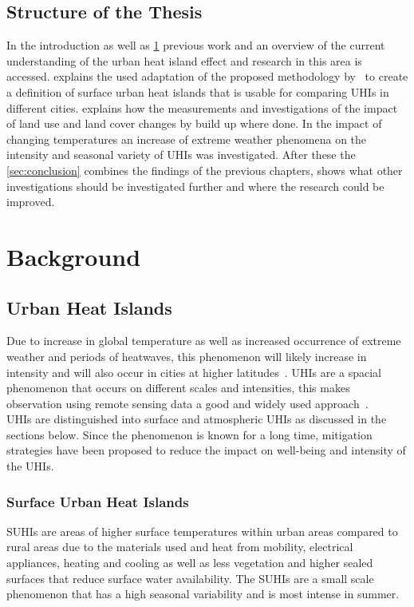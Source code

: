 \documentclass[12pt,a4paper, english]{article}
\begin{document}
  \subsection{Structure of the Thesis}
    In the introduction as well as \cref{sec:background} previous work and an overview of the current understanding of the urban heat island effect and research in this area is accessed. 
     explains the used adaptation of the proposed methodology by~\cite{Sobrino2020} to create a definition of surface urban heat islands that is usable for comparing \glspl{UHI} in different cities.  
     explains how the measurements  and investigations of the impact of land use and land cover changes by build up where done.
    In  the impact of changing temperatures an increase of extreme weather phenomena on the intensity and seasonal variety of \glspl{UHI} was investigated. 
    After these the \cref{sec:conclusion} combines the findings of the previous chapters, shows what other investigations should be investigated further and where the research could be improved. 
%
%
\section{Background}\label{sec:background}
\subsection{Urban Heat Islands}
%
Due to increase in global temperature as well as increased occurrence of extreme weather and periods of heatwaves, this phenomenon will likely increase in intensity and will also occur in cities at higher latitudes~\cite{Sachindra2016}\cite[p.~904]{Wilby2008}.
\glspl{UHI} are a spacial phenomenon that occurs on different scales and intensities, this makes observation using remote sensing data a good and widely used approach~\cite{Weng2003}.\\
\glspl{UHI} are distinguished into surface and atmospheric \glspl{UHI} as discussed in the sections below. 
Since the phenomenon is known for a long time, mitigation strategies have been proposed to reduce the impact on well-being and intensity of the UHIs.
%
\subsubsection{Surface Urban Heat Islands}\label{sec:suhi}
\glspl{SUHI} are areas of higher surface temperatures within urban areas compared to rural areas due to the materials used and heat from mobility, electrical appliances, heating and cooling as well as less vegetation and higher sealed surfaces that reduce surface water availability\cite[pp. 7-12]{EPA2008}. 
The \glspl{SUHI} are a small scale phenomenon that has a high seasonal variability and is most intense in summer.
%
\end{document}
